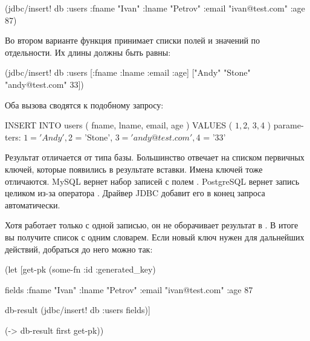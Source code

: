\begin{english}
  \begin{clojure}
(jdbc/insert! db :users
              {:fname "Ivan"
               :lname "Petrov"
               :email "ivan@test.com"
               :age 87})
  \end{clojure}
\end{english}

Во втором варианте функция принимает списки полей и значений по отдельности. Их длины должны быть равны:

\begin{english}
  \begin{clojure}
(jdbc/insert! db :users
              [:fname :lname :email :age]
              ["Andy" "Stone" "andy@test.com" 33])
  \end{clojure}
\end{english}

Оба вызова сводятся к подобному запросу:

\begin{english}
  \begin{sql}
INSERT INTO users ( fname, lname, email, age )
VALUES ( $1, $2, $3, $4 )
parameters:
  $1 = 'Andy', $2 = 'Stone',
  $3 = 'andy@test.com', $4 = '33'
  \end{sql}
\end{english}

Результат  отличается от типа базы. Большинство отвечает на  списком первичных ключей, которые появились в результате вставки. Имена ключей тоже отличаются. MySQL вернет набор записей с полем . PostgreSQL вернет запись целиком из-за оператора . Драйвер JDBC добавит его в конец запроса автоматически.

Хотя  работает только с одной записью, он не оборачивает результат в . В итоге вы получите список с одним словарем. Если новый ключ нужен для дальнейших действий, добраться до него можно так:

\begin{english}
  \begin{clojure}
(let [get-pk
      (some-fn :id :generated_key)

      fields
      {:fname "Ivan"
       :lname "Petrov"
       :email "ivan@test.com"
       :age 87}

      db-result
      (jdbc/insert! db :users fields)]

  (-> db-result first get-pk))
  \end{clojure}
\end{english}

